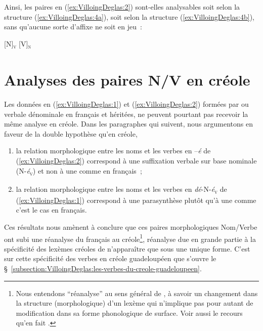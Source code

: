 \documentclass[output=paper]{langsci/langscibook}
\begin{document}
Ainsi, les paires en (\ref{ex:VilloingDeglas:2}) sont-elles analysables soit selon la structure
(\ref{ex:VilloingDeglas:4a}), soit selon la structure (\ref{ex:VilloingDeglas:4b}), sans qu'aucune sorte d'affixe ne
soit en jeu~:


\ea\label{ex:VilloingDeglas:4}

  \ea\label{ex:VilloingDeglas:4a} {[}N{]}\textsubscript{\textsc{v}}
  \ex\label{ex:VilloingDeglas:4b} {[}V{]}\textsubscript{\textsc{n}}
  \z

\z


\section{Analyses des paires N/V en
créole}\label{section:VilloingDeglas:analyses-des-paires-nv-en-créole}

Les données en (\ref{ex:VilloingDeglas:1}) et (\ref{ex:VilloingDeglas:2}) formées par  ou  verbale
dénominale en français et héritées, ne peuvent pourtant pas recevoir la
même analyse en créole. Dans les paragraphes qui suivent, nous
argumentons en faveur de la double hypothèse qu'en créole,

\begin{enumerate}\def\labelenumi{(\roman{enumi})}

\item
  la relation morphologique entre les noms et les verbes en --\emph{é}
  de (\ref{ex:VilloingDeglas:2}) correspond à une suffixation verbale sur base nominale
  (N-\emph{é}\textsubscript{\textsc{v}}) et non à une  comme en français~;
\item
  la relation morphologique entre les noms et les verbes en
  \emph{dé}-N-\emph{é}\textsubscript{\textsc{v}} de (\ref{ex:VilloingDeglas:1}) correspond à une parasynthèse plutôt
  qu'à une  comme c'est le cas en français.
\end{enumerate}

Ces résultats nous amènent à conclure que ces paires morphologiques
Nom/Verbe ont subi une réanalyse du français au créole\footnote{Nous
  entendons \enquote{réanalyse} au sens général de %
\citet[58]{Langacker77}%
%
, à
  savoir un changement dans la structure (morphologique) d'un lexème
  qui n'implique pas pour autant de modification dans sa forme
  phonologique de surface. Voir aussi le recours qu'en fait %
\citet[67--68]{DeGraff2001}%
%
.}, réanalyse due en grande partie à la spécificité des
lexèmes créoles de n'apparaître que sous une unique forme. C'est sur
cette spécificité des verbes en créole guadeloupéen que s'ouvre le §~\ref{subsection:VilloingDeglas:les-verbes-du-creole-guadeloupeen}.
\end{document}
